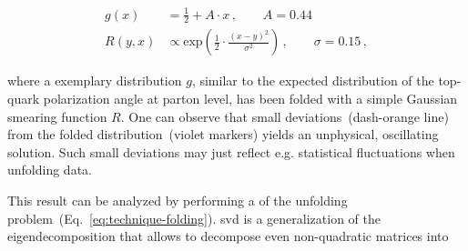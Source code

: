 \begin{subequations}\label{eq:technique-unfolding-test-model}
\begin{align}
g(x)&=\frac{1}{2}+A\cdot x\,,\qquad A=0.44\\
R(y,x)&\propto\mathrm{exp}\left(\frac{1}{2}\cdot\frac{(x-y)^2}{\sigma^2}\right)\,,\qquad \sigma=0.15\,,
\end{align}
\end{subequations}

where a exemplary distribution $g$, similar to the expected distribution of the top-quark polarization angle at parton level, has been folded with a simple Gaussian smearing function $R$. One can observe that small deviations~(dash-orange line) from the folded distribution~(violet markers) yields an unphysical, oscillating solution. Such small deviations may just reflect e.g. statistical fluctuations when unfolding data.


This result can be analyzed by performing a  of the unfolding problem~(Eq.~\ref{eq:technique-folding}). \Gls{svd} is a generalization of the eigendecomposition that allows to decompose even non-quadratic matrices into 

